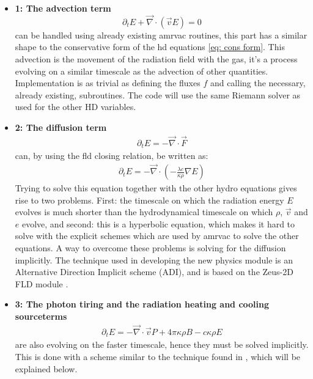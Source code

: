\begin{itemize}
\item \textbf{1: The advection term}
\begin{equation}
\partial_t E + \vec{\nabla} \cdot \left( \vec{v} E \right) = 0
\end{equation}
can be handled using already existing amrvac routines, this part has a similar shape to the conservative form of the hd equations \eqref{eq: cons form}. This advection is the movement of the radiation field with the gas, it's a process evolving on a similar timescale as the advection of other quantities. Implementation is as trivial as defining the fluxes $f$ and calling the necessary, already existing, subroutines. The code will use the same Riemann solver as used for the other HD variables.\\

\item \textbf{2: The diffusion term}
\begin{align}
\partial_t E = - \vec{\nabla} \cdot \vec{F}
\end{align}
can, by using the fld closing relation, be written as:
\begin{align}
\partial_t E = - \vec{\nabla} \cdot \left( -\frac{\lambda c}{\kappa \rho} \nabla E\right)
\end{align}
Trying to solve this equation together with the other hydro equations gives rise to two problems. First: the timescale on which the radiation energy $E$ evolves is much shorter than the hydrodynamical timescale on which $\rho$, $\vec{v}$ and $e$ evolve, and second: this is a hyperbolic equation, which makes it hard to solve with the explicit schemes which are used by amrvac to solve the other equations. A way to overcome these problems is solving for the diffusion implicitly. The technique used in developing the new physics module is an Alternative Direction Implicit scheme (ADI), and is based on the Zeus-2D FLD module \cite{Turener12001}.\\

\item \textbf{3: The photon tiring and the radiation heating and cooling sourceterms}
\begin{align}
\partial_t E = - \vec{\nabla} \cdot \vec{v} P + 4\pi \kappa\rho B - c \kappa \rho E
\end{align}
are also evolving on the faster timescale, hence they must be solved implicitly. This is done with a scheme similar to the technique found in \cite{Turner12001}, which will be explained below.
\end{itemize}

